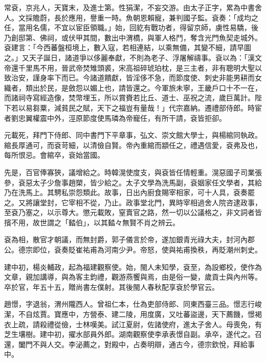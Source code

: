 \begin{pinyinscope}
 常袞，京兆人，天寶末，及進士第。性狷潔，不妄交游。由太子正字，累為中書舍人。文採贍蔚，長於應用，譽重一時。魚朝恩賴寵，兼判國子監。袞奏：「成均之任，當用名儒，不宜以宦臣領職。」始，回紇有戰功者，得留京師，虜性易驕，後乃創邸第、佛祠，或伏甲其間，數出中渭橋，與軍人格鬥，奪含光門魚契走城外。袞建言：「今西蕃盤桓境上，數入寇，若相連結，以乘無備，其變不細，請早圖之。」又天子誕日，諸道爭以侈麗奉獻，不則為老子、浮屠解禱事。袞以為：「漢文帝還千里馬不用，晉武帝焚雉頭裘，宋高祖碎琥珀枕，是三主者，非有聰明大聖以致治安，謹身率下而已。今諸道饋獻，皆淫侈不急，而節度使、刺史非能男耕而女織者，類出於民，是斂怨以媚上也，請皆還之。今軍旅未寧，王畿戶口十不一在，而諸祠寺寫經造像，焚幣埋玉，所以賞賚若比丘、道士、巫祝之流，歲巨萬計。陛下若以易芻粟，減貧民之賦，天下之福豈有量哉！」代宗嘉納。遷禮部侍郎。時宦者劉忠翼權震中外，涇原節度使馬璘為帝寵任，有所干請，袞皆拒卻。



 元載死，拜門下侍郎、同中書門下平章事，弘文、崇文館大學士，與楊綰同執政。綰長厚通可，而袞苛細，以清儉自賢。帝內重綰而顓任之，禮遇信愛，袞弗及也，每所恨忌。會綰卒，袞始當國。



 先是，百官俸寡狹，議增給之。時韓滉使度支，與袞皆任情輕重。滉惡國子司業張參，袞惡太子少詹事趙槊，皆少給之。太子文學為洗馬副，袞姻家任文學者，其給乃在洗馬上。其騁私崇怨類此。故事，日出內廚食賜宰相家，可十人具，袞奏罷之。又將讓堂封，它宰相不從，乃止。政事堂北門，異時宰相過舍人院咨逮政事，至袞乃塞之，以示尊大。懲元載敗，窒賣官之路，然一切以公議格之，非文詞者皆擯不用，故世謂之「濌伯」，以其濌々無賢不肖之辨云。



 袞為相，散官才朝議，而無封爵，郭子儀言於帝，遂加銀青光祿大夫，封河內郡公。德宗即位，袞奏貶崔祐甫為河南少尹。帝怒，使與祐甫換秩，再貶潮州刺史。



 建中初，楊炎輔政，起為福建觀察使。始，閩人未知學，袞至，為設鄉校，使作為文章，親加講導，與為客主鈞禮，觀游燕饗與焉，由是俗一變，歲貢士與內州等。卒於官，年五十五，贈尚書左僕射。其後閩人春秋配享袞於學官云。



 趙憬，字退翁，渭州隴西人。曾祖仁本，仕為吏部侍郎、同東西臺三品。憬志行峻潔，不自炫賈。寶應中，方營泰、建二陵，用度廣，又吐蕃盜邊，天下薦饑，憬褐衣上疏，請殺禮從儉，士林嘆美。試江夏尉，佐諸使府，進太子舍人。母喪免，有芝生壤樹。建中初，擢水部員外郎。湖南觀察使李承表憬自副。承卒，遂代之。召還，闔門不與人交。李泌薦之，對殿中，占奏明辯，通古今，德宗欽悅，拜給事中。




\end{pinyinscope}

